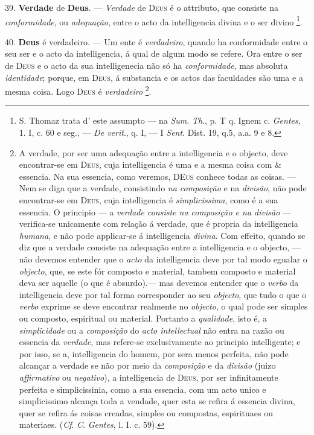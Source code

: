 39. \textbf{Verdade} de \textbf{Deus}. --- \emph{Verdade} de \textsc{Deus} é o attributo, que consiste na \emph{conformidade}, ou \emph{adequação}, entre o acto da intelligencia divina e o ser divino \footnote{S. Thomaz trata d' este assumpto --- na \emph{Sum}. \emph{Th}., p. T q. Ignem c. \emph{Gentes}, 1. I, c. 60 e seg., --- \emph{De verit}., q. I, --- I \emph{Sent}. Dist. 19, q.5, a.a. 9 e 8.}.

40. \textbf{Deus} é verdadeiro. --- Um ente é \emph{verdadeiro}, quando ha conformidade entre o seu ser e o acto da intelligencia, á qual de algum modo se refere. Ora entre o ser de \textsc{Deus} e o acto da sua intelligenecia não só ha \emph{conformidade}, mas absoluta \emph{identidade}; porque, em \textsc{Deus}, á substancia e os actos das faculdades são uma e a mesma coisa. Logo \textsc{Deus} é \emph{verdadeiro} \footnote{A verdade, por ser uma adequação entre a intelligencia e o objecto, deve encontrar-se em \textsc{Deus}, cuja intelligencia é uma e a mesma coisa com \& essencia. Na sua essencia, como veremos, \textsc{DEus} conhece todas as coisas. --- Nem se diga que a verdade, consistindo \emph{na composição} e na \emph{divisão}, não pode encontrar-se em \textsc{Deus}, cuja intelligencia é \emph{simplicissima}, como é a sua essencia. O principio --- a \emph{verdade consiste na composição e na divisão} --- verifica-se unicamente com relação á verdade, que é propria da intelligencia \emph{humana}, e não pode applicar-se á intelligencia \emph{divina}. Com effeito, quando se diz que a verdade consiste na adequação entre a intelligencia e o objecto, --- não devemos entender que o \emph{acto} da intelligencia deve por tal modo egualar o \emph{objecto}, que, se este fór composto e material, tambem composto e material deva ser aquelle (o que é absurdo).--- mas devemos entender que o \emph{verbo} da intelligencia deve por tal forma corresponder ao seu \emph{objecto}, que tudo o que o \emph{verbo} exprime se deve encontrar realmente no \emph{objecto}, o qual pode ser simples ou composto, espiritual ou material. Portanto a \emph{qualidade}, isto é, a \emph{simplicidade} ou a \emph{composição} do \emph{acto intellectual} não entra na razão ou essencia da \emph{verdade}, mas refere-se exclusivamente ao principio intelligente; e por isso, se a, intelligencia do homem, por sera menos perfeita, não pode alcançar a verdade se não por meio da \emph{composição} e da \emph{divisão} (juizo \emph{affirmativo} ou \emph{negativo}), a intelligencia de \textsc{Deus}, por ser infinitamente perfeita e simplicissinia, como a sua essencia, com um acto unico e simplicissimo alcança toda a vendade, quer esta se refira á essencia divina, quer se refira ás coisas creadas, simples ou compostas, espirituaes ou materiaes. (\emph{Cf}. \emph{C}. \emph{Gentes}, l. I. c. 59).}.

